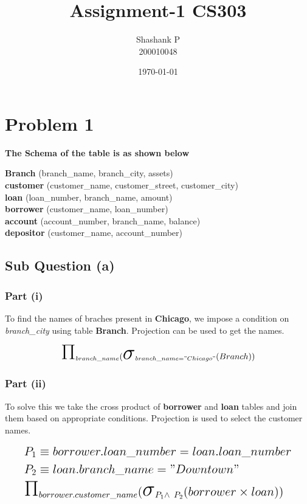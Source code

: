 \documentclass{article}
\title{Assignment-1 CS303}
\author{Shashank P \\ 200010048}
\date{\today}
\newcommand{\bigsigma}{\makebox{\Huge\ensuremath{\sigma}}}
\newcommand{\bigpi}{\makebox{\Huge\ensuremath{\Pi}}}
\begin{document}
\maketitle

\section{Problem 1}
\textbf{The Schema of the table is as shown below}
\begin{center}
    \textbf{Branch} (branch\_name, branch\_city, assets) \\ 
    \textbf{customer} (customer\_name, customer\_street, customer\_city) \\ 
    \textbf{loan} (loan\_number, branch\_name, amount) \\ 
    \textbf{borrower} (customer\_name, loan\_number) \\ 
    \textbf{account} (account\_number, branch\_name, balance) \\ 
    \textbf{depositor} (customer\_name, account\_number) 
\end{center}
\subsection{Sub Question (a)}
\subsubsection{Part (i)}
\hspace{\parindent} To find the names of braches present in \textbf{Chicago}, we
impose a condition on \textit{branch\_city} using table \textbf{Branch}. Projection
can be used to get the names.

\begin{equation}
  \Large \bigpi_{branch\_name} (\bigsigma_{branch\_name = "Chicago"}(Branch))
\end{equation}

\subsubsection{Part (ii)}
\hspace{\parindent} To solve this we take the cross product of 
\textbf{borrower} and \textbf{loan} tables and join them based on
appropriate conditions. Projection is used to select the customer names.

\begin{equation}
  \Large 
    \begin{split}
       & P_1 \equiv  borrower.loan\_number = loan.loan\_number \\
       & P_2 \equiv  loan.branch\_name = "Downtown" \\
       & \bigpi_{borrower.customer\_name}  (\bigsigma_{P_1 \wedge \ P_2}(borrower \times loan))
    \end{split}
\end{equation}
 
\end{document}
